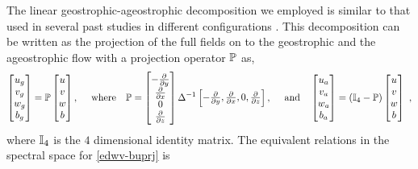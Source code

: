 \documentclass[../Rajarshi-thesis-draft.tex]{subfiles}
\begin{document}
The linear geostrophic-ageostrophic decomposition we employed is similar to that used in several past studies in different configurations \citep{Bartello95, Embid_Majda_1998, Hernandez_Smith_Stechmann_2014, TD20, RT26}. This decomposition can be written as the projection of the full fields on to the geostrophic and the ageostrophic flow with a projection operator $\mathbb{P}$ as, 
\begin{align}
\label{edwv-buprj}
\begin{split}
 \begin{bmatrix}
 u_g \\
 v_g \\
 w_g \\
 b_g \\
 \end{bmatrix}= \mathbb{P}
 \begin{bmatrix}
 u \\
 v \\
 w \\
 b \\
 \end{bmatrix}, \quad\mbox{ where} \quad 
 \mathbb{P} = \begin{bmatrix}
 -\frac{\partial}{\partial y} \\
 \frac{\partial}{\partial x} \\
 0\\
 \frac{\partial}{\partial z}
 \end{bmatrix}\Delta^{-1}
 \begin{bmatrix}
 -\frac{\partial}{\partial y},\frac{\partial}{\partial x},0,\frac{\partial}{\partial z} 
 \end{bmatrix}, \quad \mbox{ and} \quad 
	\begin{bmatrix}
		u_a \\
		v_a \\
		w_a \\
		b_a \\
	\end{bmatrix}= \left( \mathbb{I}_{4} - \mathbb{P} \right)
	\begin{bmatrix}
		u \\
		v \\
		w \\
		b \\
	\end{bmatrix} \ ,
\end{split}
\end{align}
where $\mathbb{I}_4$ is the $4$ dimensional identity matrix. The equivalent relations in the spectral space for \eqref{edwv-buprj} is 
\end{document}
